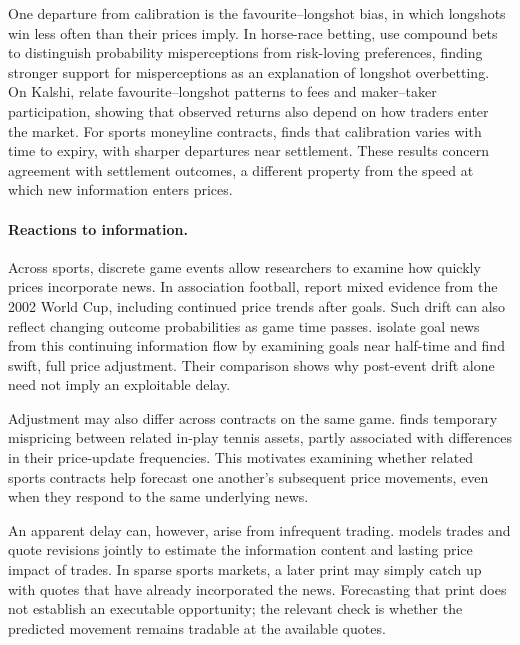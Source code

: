 \documentclass[12pt,a4paper,oneside]{report}
\begin{document}
One departure from calibration is the favourite--longshot bias, in which longshots
win less often than their prices imply. In horse-race betting,
\citet{snowberg2010explaining} use compound bets to distinguish probability
misperceptions from risk-loving preferences, finding stronger support for
misperceptions as an explanation of longshot overbetting.
On Kalshi, \citet{burgi2025makers} relate favourite--longshot patterns to fees
and maker--taker participation, showing that observed returns also depend on
how traders enter the market.
For sports moneyline contracts, \citet{moshrefi2026prices} finds that calibration
varies with time to expiry, with sharper departures near settlement. These
results concern agreement with settlement outcomes, a different property from
the speed at which new information enters prices.

\paragraph{Reactions to information.}
Across sports, discrete game events allow researchers to examine how quickly
prices incorporate news. In association football, \citet{gil2007testing} report
mixed evidence from the 2002 World Cup, including continued price trends after
goals. Such drift can also reflect changing outcome probabilities as game time
passes. \citet{croxson2014information} isolate goal news from this continuing
information flow by examining goals near half-time and find swift, full price
adjustment. Their comparison shows why post-event drift alone need not imply
an exploitable delay.

Adjustment may also differ across contracts on the same game.
\citet{brown2014information} finds temporary mispricing between related in-play
tennis assets, partly associated with differences in their price-update
frequencies. This motivates examining whether related sports contracts help
forecast one another's subsequent price movements, even when they respond to
the same underlying news.

An apparent delay can, however, arise from infrequent trading.
\citet{hasbrouck1991measuring} models trades and quote revisions jointly to
estimate the information content and lasting price impact of trades. In sparse
sports markets, a later print may simply catch up with quotes that have already
incorporated the news. Forecasting that print does not establish an executable
opportunity; the relevant check is whether the predicted movement remains
tradable at the available quotes.
\end{document}
